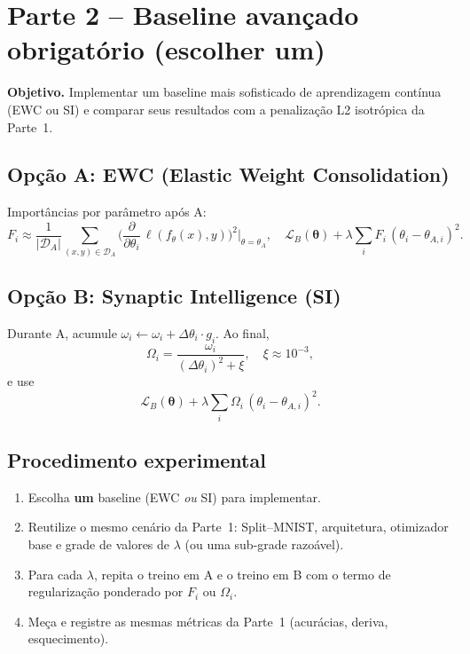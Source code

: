 \documentclass[9pt,a4paper]{extarticle}
\begin{document}
\section*{Parte 2 -- Baseline avançado obrigatório (escolher um)}

\textbf{Objetivo.} Implementar um baseline mais sofisticado de aprendizagem contínua (EWC ou SI) e comparar seus resultados com a penalização L2 isotrópica da Parte~1.

\subsection*{Opção A: EWC (Elastic Weight Consolidation)}
Importâncias por parâmetro após A:
\[
F_i \approx \frac{1}{|\mathcal{D}_A|}\sum_{(x,y)\in\mathcal{D}_A}
\Big(\frac{\partial}{\partial \theta_i}\,\ell(f_{\theta}(x),y)\Big)^2\Big|_{\theta=\theta_A},
\quad
\mathcal{L}_B(\bm{\theta}) + \lambda \sum_i F_i\,(\theta_i-\theta_{A,i})^2.
\]

\subsection*{Opção B: Synaptic Intelligence (SI)}
Durante A, acumule $\omega_i \leftarrow \omega_i + \Delta\theta_i \cdot g_i$. Ao final,
\[
\Omega_i=\frac{\omega_i}{(\Delta\theta_i)^2+\xi}, \quad \xi\approx 10^{-3},
\]
e use
\[
\mathcal{L}_B(\bm{\theta}) + \lambda \sum_i \Omega_i\,(\theta_i-\theta_{A,i})^2.
\]

\subsection*{Procedimento experimental}
\begin{enumerate}
    \item Escolha \textbf{um} baseline (EWC \emph{ou} SI) para implementar.
    \item Reutilize o mesmo cenário da Parte~1: Split--MNIST, arquitetura, otimizador base e grade de valores de $\lambda$ (ou uma sub-grade razoável).
    \item Para cada $\lambda$, repita o treino em A e o treino em B com o termo de regularização ponderado por $F_i$ ou $\Omega_i$.
    \item Meça e registre as mesmas métricas da Parte~1 (acurácias, deriva, esquecimento).
\end{enumerate}
\end{document}

